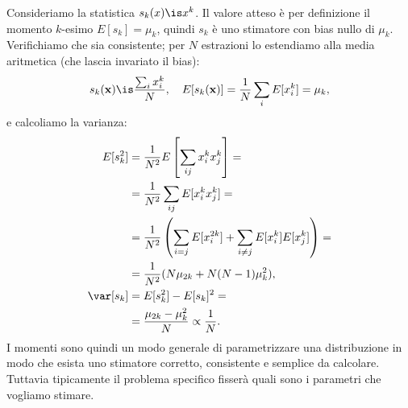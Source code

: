 

Consideriamo la statistica $s_k(x)\is x^k$.
Il valore atteso è per definizione il momento $k$-esimo
$E[s_k]=\mu_k$,
quindi $s_k$ è uno stimatore con bias nullo di $\mu_k$.
Verifichiamo che sia consistente;
per $N$ estrazioni lo estendiamo alla media aritmetica (che lascia invariato il bias):
\begin{align*}
	s_k(\mathbf x)
	\is \frac{\sum_i x_i^k}N, \quad
	E[s_k(\mathbf x)]
	= \frac1N \sum_i E[x_i^k]
	= \mu_k,
\end{align*}
e calcoliamo la varianza:
\begin{align*}
	E[s_k^2]
	&= \frac1{N^2} E \left[ \sum_{ij} x_i^k x_j^k \right] = \\
	&= \frac1{N^2} \sum_{ij} E[x_i^k x_j^k] = \\
	&= \frac1{N^2} \left( \sum_{i=j} E[x_i^{2k}] + \sum_{i\neq j} E[x_i^k] E[x_j^k] \right) = \\
	&= \frac1{N^2} (N\mu_{2k} + N(N-1)\mu_k^2), \\
	\var[s_k]
	&= E[s_k^2] - E[s_k]^2 = \\
	&= \frac{\mu_{2k} - \mu_k^2}N
	\propto \frac1N.
\end{align*}
I momenti sono quindi un modo generale di parametrizzare una distribuzione in modo che esista uno stimatore corretto, consistente e semplice da calcolare.
Tuttavia tipicamente il problema specifico fisserà quali sono i parametri che vogliamo stimare.

\label{sec:ml}

